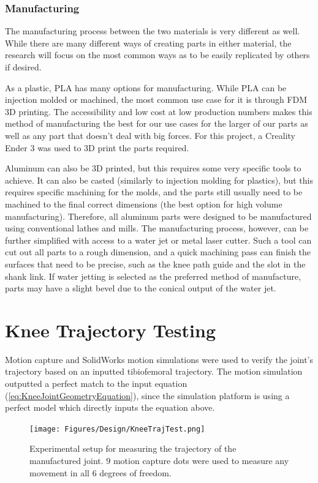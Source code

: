 \subsubsection{Manufacturing}

The manufacturing process between the two materials is very different as well. While there are many different ways of creating parts in either material, the research will focus on the most common ways as to be easily replicated by others if desired.

As a plastic, PLA has many options for manufacturing. While PLA can be injection molded or machined, the most common use case for it is through FDM 3D printing. The accessibility and low cost at low production numbers makes this method of manufacturing the best for our use cases for the larger of our parts as well as any part that doesn't deal with big forces. For this project, a Creality Ender 3 was used to 3D print the parts required. 

Aluminum can also be 3D printed, but this requires some very specific tools to achieve. It can also be casted (similarly to injection molding for plastics), but this requires specific machining for the molds, and the parts still usually need to be machined to the final correct dimensions (the best option for high volume manufacturing). Therefore, all aluminum parts were designed to be manufactured using conventional lathes and mills. The manufacturing process, however, can be further simplified with access to a water jet or metal laser cutter. Such a tool can cut out all parts to a rough dimension, and a quick machining pass can finish the surfaces that need to be precise, such as the knee path guide and the slot in the shank link. If water jetting is selected as the preferred method of manufacture, parts may have a slight bevel due to the conical output of the water jet.

\section{Knee Trajectory Testing}
Motion capture and SolidWorks motion simulations were used to verify the joint's trajectory based on an inputted tibiofemoral trajectory. The motion simulation outputted a perfect match to the input equation (\autoref{eq:KneeJointGeometryEquation}), since the simulation platform is using a perfect model which directly inputs the equation above.

\begin{figure}[ht!]
    \centering
    \texttt{[image: Figures/Design/KneeTrajTest.png]}
    \caption{Experimental setup for measuring the trajectory of the manufactured joint. 9 motion capture dots were used to measure any movement in all 6 degrees of freedom.}
    \label{fig:TrajTestSetup}
\end{figure}

